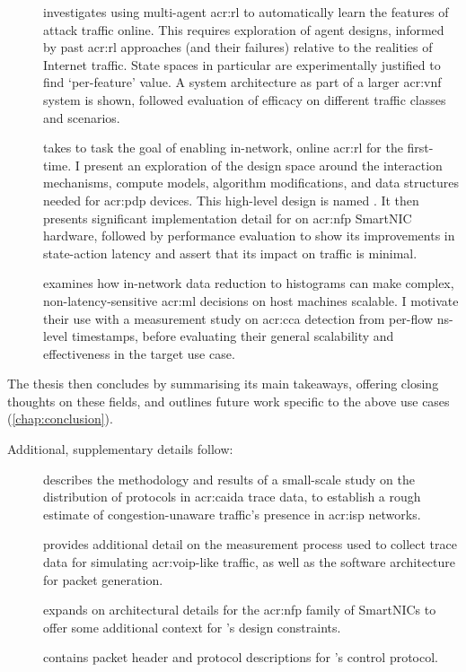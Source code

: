 \begin{description}
	\item[] investigates using multi-agent \gls{acr:rl} to automatically learn the features of attack traffic online. This requires exploration of agent designs, informed by past \gls{acr:rl} approaches (and their failures) relative to the realities of Internet traffic. State spaces in particular are experimentally justified to find `per-feature' value. A system architecture as part of a larger \gls{acr:vnf} system is shown, followed evaluation of efficacy on different traffic classes and scenarios.
	\item[] takes to task the goal of enabling in-network, online \gls{acr:rl} for the first-time. I present an exploration of the design space around the interaction mechanisms, compute models, algorithm modifications, and data structures needed for \gls{acr:pdp} devices. This high-level design is named \approachshort{}. It then presents significant implementation detail for \approachshort{} on \gls{acr:nfp} SmartNIC hardware, followed by performance evaluation to show its improvements in state-action latency and assert that its impact on traffic is minimal.
	\item[] examines how in-network data reduction to histograms can make complex, non-latency-sensitive \gls{acr:ml} decisions on host machines scalable. I motivate their use with a measurement study on \gls{acr:cca} detection from per-flow \unit{\nano\second}-level timestamps, before evaluating their general scalability and effectiveness in the target use case.
\end{description}
The thesis then concludes by summarising its main takeaways, offering closing thoughts on these fields, and outlines future work specific to the above use cases (\cref{chap:conclusion}).

Additional, supplementary details follow:
\begin{description}
	\item[] describes the methodology and results of a small-scale study on the distribution of protocols in \gls{acr:caida} trace data, to establish a rough estimate of congestion-unaware traffic's presence in \gls{acr:isp} networks.
	\item[] provides additional detail on the measurement process used to collect trace data for simulating \gls{acr:voip}-like traffic, as well as the software architecture for packet generation.
	\item[] expands on architectural details for the \gls{acr:nfp} family of SmartNICs to offer some additional context for \approachshort{}'s design constraints.
	\item[] contains packet header and protocol descriptions for \approachshort{}'s control protocol.
\end{description}